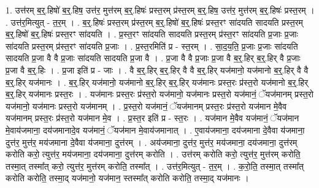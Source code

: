 \documentclass[17pt]{extarticle}
\begin{document}
1. उत्त॑रम् ब॒र्॒.हिषो॑ ब॒र्॒.हिष॒ उत्त॑र॒ मुत्त॑रम् ब॒र्॒.हिषः॑ प्रस्त॒रम् प्र॑स्त॒रम् ब॒र्॒.हिष॒ उत्त॑र॒ मुत्त॑रम् ब॒र्॒.हिषः॑ प्रस्त॒रम् । . उत्त॑र॒मित्युत् - त॒र॒म् । . ब॒र्॒.हिषः॑ प्रस्त॒रम् प्र॑स्त॒रम् ब॒र्॒.हिषो॑ ब॒र्॒.हिषः॑ प्रस्त॒रꣳ सा॑दयति सादयति प्रस्त॒रम् ब॒र्॒.हिषो॑ ब॒र्॒.हिषः॑ प्रस्त॒रꣳ सा॑दयति । . प्र॒स्त॒रꣳ सा॑दयति सादयति प्रस्त॒रम् प्र॑स्त॒रꣳ सा॑दयति प्र॒जाः प्र॒जाः सा॑दयति प्रस्त॒रम् प्र॑स्त॒रꣳ सा॑दयति प्र॒जाः । . प्र॒स्त॒रमिति॑ प्र - स्त॒रम् । . सा॒द॒य॒ति॒ प्र॒जाः प्र॒जाः सा॑दयति सादयति प्र॒जा वै वै प्र॒जाः सा॑दयति सादयति प्र॒जा वै । . प्र॒जा वै वै प्र॒जाः प्र॒जा वै ब॒र्॒.हिर् ब॒र्॒.हिर् वै प्र॒जाः प्र॒जा वै ब॒र्॒.हिः । . प्र॒जा इति॑ प्र - जाः । . वै ब॒र्॒.हिर् ब॒र्॒.हिर् वै वै ब॒र्॒.हिर् यज॑मानो॒ यज॑मानो ब॒र्॒.हिर् वै वै ब॒र्॒.हिर् यज॑मानः । . ब॒र्॒.हिर् यज॑मानो॒ यज॑मानो ब॒र्॒.हिर् ब॒र्॒.हिर् यज॑मानः प्रस्त॒रः प्र॑स्त॒रो यज॑मानो ब॒र्॒.हिर् ब॒र्॒.हिर् यज॑मानः प्रस्त॒रः । . यज॑मानः प्रस्त॒रः प्र॑स्त॒रो यज॑मानो॒ यज॑मानः प्रस्त॒रो यज॑मानं॒ ॅयज॑मानम् प्रस्त॒रो यज॑मानो॒ यज॑मानः प्रस्त॒रो यज॑मानम् । . प्र॒स्त॒रो यज॑मानं॒ ॅयज॑मानम् प्रस्त॒रः प्र॑स्त॒रो यज॑मान मे॒वैव यज॑मानम् प्रस्त॒रः प्र॑स्त॒रो यज॑मान मे॒व । . प्र॒स्त॒र इति॑ प्र - स्त॒रः । . यज॑मान मे॒वैव यज॑मानं॒ ॅयज॑मान मे॒वाय॑जमाना॒ दय॑जमानादे॒व यज॑मानं॒ ॅयज॑मान मे॒वाय॑जमानात् । . ए॒वाय॑जमाना॒ दय॑जमाना दे॒वैवा य॑जमाना॒ दुत्त॑र॒ मुत्त॑र॒ मय॑जमाना दे॒वैवा य॑जमाना॒ दुत्त॑रम् । . अय॑जमाना॒ दुत्त॑र॒ मुत्त॑र॒ मय॑जमाना॒ दय॑जमाना॒ दुत्त॑रम् करोति करो॒ त्युत्त॑र॒ मय॑जमाना॒ दय॑जमाना॒ दुत्त॑रम् करोति । . उत्त॑रम् करोति करो॒ त्युत्त॑र॒ मुत्त॑रम् करोति॒ तस्मा॒त् तस्मा᳚त् करो॒ त्युत्त॑र॒ मुत्त॑रम् करोति॒ तस्मा᳚त् । . उत्त॑र॒मित्युत् - त॒र॒म् । . क॒रो॒ति॒ तस्मा॒त् तस्मा᳚त् करोति करोति॒ तस्मा॒द् यज॑मानो॒ यज॑मान॒ स्तस्मा᳚त् करोति करोति॒ तस्मा॒द् यज॑मानः । \newline
\end{document}
